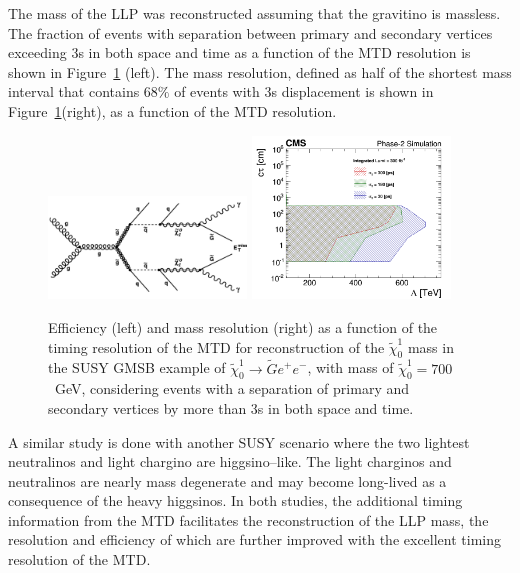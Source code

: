 The mass of the LLP was reconstructed assuming that the gravitino is massless. The fraction of events with separation between primary and secondary
vertices exceeding 3s in both space and time as a function of the MTD resolution is shown in
Figure~\ref{fig:cmsupgrade_mtd} (left). The mass resolution, defined as half of the shortest mass interval that contains $68\%$ of events with 3s displacement is shown in Figure~\ref{fig:cmsupgrade_mtd}(right), 
as a function of the MTD resolution. 

\begin{figure}[hbtp]\begin{center}
\includegraphics[width=0.47\textwidth]{figures/MTD/diagram.png}
\includegraphics[width=0.47\textwidth]{figures/MTD/Limits_excl_2D_ComparingRes.png}
\caption{ 
Efficiency (left) and mass resolution (right) as a function of the timing resolution of the MTD for reconstruction of the $\tilde{\chi}_0^1$ mass in the SUSY GMSB example of $\tilde{\chi}_0^1 \to \tilde{G} e^{+} e^{-}$, with
mass of $\tilde{\chi}_0^1=700$~GeV, considering events with a separation of primary and secondary vertices by more than 3s in both space and time.
}
\label{fig:cmsupgrade_mtd}
\end{center}
\end{figure}

A similar study is done with another SUSY scenario where the two lightest neutralinos and light chargino are higgsino–like. The light charginos and neutralinos are nearly mass degenerate and
may become long-lived as a consequence of the heavy higgsinos. 
In both studies, the additional timing information from the MTD facilitates the reconstruction of the LLP mass, the resolution and efficiency of which are further improved with the excellent timing resolution of the MTD.

